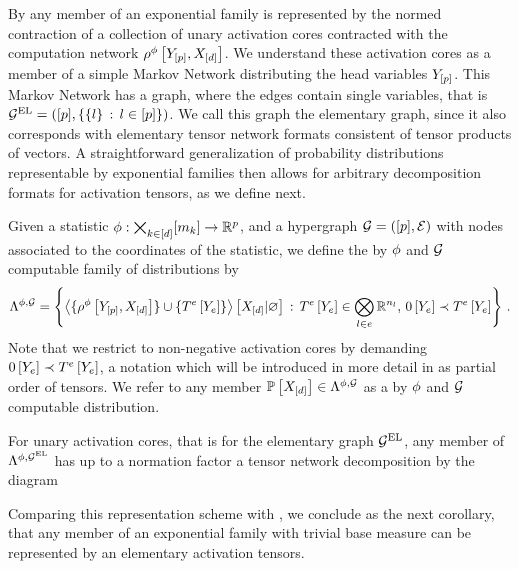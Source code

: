 By  any member of an exponential family is represented by the normed contraction of a collection of unary activation cores contracted with the computation network $\rho^{\phi}\left[Y_{[p]},X_{[d]}\right]$.
We understand these activation cores as a member of a simple Markov Network distributing the head variables $Y_{[p]}$.
This Markov Network has a graph, where the edges contain single variables, that is $\mathcal{G}^{\mathrm{EL}}=([p],\{\{l\} \, : \, l\in[p]\})$.
We call this graph the elementary graph, since it also corresponds with elementary tensor network formats consistent of tensor products of vectors.
A straightforward generalization of probability distributions representable by exponential families then allows for arbitrary decomposition formats for activation tensors, as we define next.

\begin{definition}
    \label{def:realizableStatDistributions}
    Given a statistic $\phi : \bigtimes_{k\in[d]}[m_{k}] \rightarrow \mathbb{R}^{p}$, and a hypergraph $\mathcal{G}=([p],\mathcal{E})$ with nodes associated to the coordinates of the statistic, we define the by $\phi$ and $\mathcal{G}$ computable family of distributions by
    \begin{align*}
        \Lambda^{\phi,\mathcal{G}}
        = \left\{ \left\langle \{\rho^{\phi}\left[Y_{[p]},X_{[d]}\right]\} \cup \{T^{e}\left[Y_{e}\right]\}\right\rangle \left[ X_{[d]} | \varnothing \right]  \, : \,T^{e}\left[Y_{e}\right]\in\bigotimes_{l\in e}\mathbb{R}^{n_{l}}, \, 0\left[Y_{e}\right]\prec T^{e}\left[Y_{e}\right] \right\} \, .
    \end{align*}
    Note that we restrict to non-negative activation cores by demanding $0\left[Y_{e}\right]\prec T^{e}\left[Y_{e}\right]$, a notation which will be introduced in more detail in  as partial order of tensors.
    We refer to any member $\mathbb{P}\left[X_{[d]}\right]\in\Lambda^{\phi,\mathcal{G}}$ as a by $\phi$ and $\mathcal{G}$ computable distribution.
\end{definition}

For unary activation cores, that is for the elementary graph $\mathcal{G}^{\mathrm{EL}}$, any member of $\Lambda^{\phi,\mathcal{G}^{\mathrm{EL}}}$ has up to a normation factor a tensor network decomposition by the diagram
\begin{center}
    
\end{center}
Comparing this representation scheme with , we conclude as the next corollary, that any member of an exponential family with trivial base measure can be represented by an elementary activation tensors.

